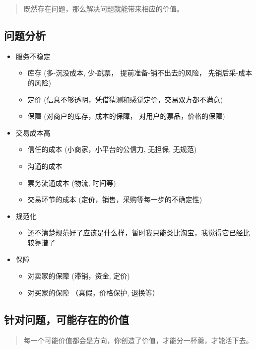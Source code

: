 \documentclass[11pt,a4paper]{article}
\begin{document}
\begin{quote}
既然存在问题，那么解决问题就能带来相应的价值。
\end{quote}

\subsection*{问题分析}
\label{sec:orgheadline3}
\begin{itemize}
\item 服务不稳定
\begin{itemize}
\item 库存 (多-沉没成本, 少-跳票， 提前准备-销不出去的风险， 先销后采-成本的风险)
\item 定价 (信息不够透明，凭借猜测和感觉定价，交易双方都不满意)
\item 保障 (对商户的库存，成本的保障， 对用户的票品，价格的保障)
\end{itemize}

\item 交易成本高
\begin{itemize}
\item 信任的成本 (小商家，小平台的公信力, 无担保, 无规范)
\item 沟通的成本
\item 票务流通成本 (物流, 时间等)
\item 交易环节的成本 (定价，销售，采购等每一步的不确定性)
\end{itemize}

\item 规范化
\begin{itemize}
\item 还不清楚规范好了应该是什么样，暂时我只能类比淘宝，我觉得它已经比较靠谱了
\end{itemize}

\item 保障
\begin{itemize}
\item 对卖家的保障  (滞销，资金, 定价)
\item 对买家的保障 （真假，价格保护, 退换等）
\end{itemize}
\end{itemize}

\subsection*{针对问题，可能存在的价值}
\label{sec:orgheadline4}

\begin{quote}
每一个可能价值都会是方向，你创造了价值，才能分一杯羹，才能活下去。
\end{quote}
\end{document}
